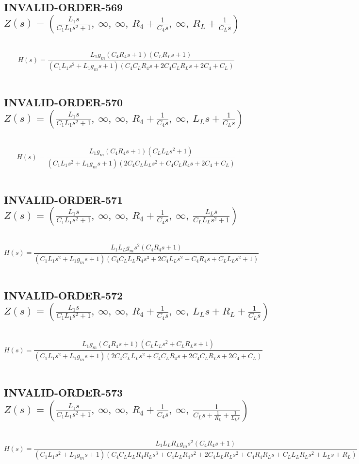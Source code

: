 \documentclass{article}
\begin{document}
\subsection{INVALID-ORDER-569 $Z(s) = \left( \frac{L_{1} s}{C_{1} L_{1} s^{2} + 1}, \  \infty, \  \infty, \  R_{4} + \frac{1}{C_{4} s}, \  \infty, \  R_{L} + \frac{1}{C_{L} s}\right)$ } \ 
\textbf{\[H(s) = \frac{L_{1} g_{m} \left(C_{4} R_{4} s + 1\right) \left(C_{L} R_{L} s + 1\right)}{\left(C_{1} L_{1} s^{2} + L_{1} g_{m} s + 1\right) \left(C_{4} C_{L} R_{4} s + 2 C_{4} C_{L} R_{L} s + 2 C_{4} + C_{L}\right)}\] } \ 
\subsection{INVALID-ORDER-570 $Z(s) = \left( \frac{L_{1} s}{C_{1} L_{1} s^{2} + 1}, \  \infty, \  \infty, \  R_{4} + \frac{1}{C_{4} s}, \  \infty, \  L_{L} s + \frac{1}{C_{L} s}\right)$ } \ 
\textbf{\[H(s) = \frac{L_{1} g_{m} \left(C_{4} R_{4} s + 1\right) \left(C_{L} L_{L} s^{2} + 1\right)}{\left(C_{1} L_{1} s^{2} + L_{1} g_{m} s + 1\right) \left(2 C_{4} C_{L} L_{L} s^{2} + C_{4} C_{L} R_{4} s + 2 C_{4} + C_{L}\right)}\] } \ 
\subsection{INVALID-ORDER-571 $Z(s) = \left( \frac{L_{1} s}{C_{1} L_{1} s^{2} + 1}, \  \infty, \  \infty, \  R_{4} + \frac{1}{C_{4} s}, \  \infty, \  \frac{L_{L} s}{C_{L} L_{L} s^{2} + 1}\right)$ } \ 
\textbf{\[H(s) = \frac{L_{1} L_{L} g_{m} s^{2} \left(C_{4} R_{4} s + 1\right)}{\left(C_{1} L_{1} s^{2} + L_{1} g_{m} s + 1\right) \left(C_{4} C_{L} L_{L} R_{4} s^{3} + 2 C_{4} L_{L} s^{2} + C_{4} R_{4} s + C_{L} L_{L} s^{2} + 1\right)}\] } \ 
\subsection{INVALID-ORDER-572 $Z(s) = \left( \frac{L_{1} s}{C_{1} L_{1} s^{2} + 1}, \  \infty, \  \infty, \  R_{4} + \frac{1}{C_{4} s}, \  \infty, \  L_{L} s + R_{L} + \frac{1}{C_{L} s}\right)$ } \ 
\textbf{\[H(s) = \frac{L_{1} g_{m} \left(C_{4} R_{4} s + 1\right) \left(C_{L} L_{L} s^{2} + C_{L} R_{L} s + 1\right)}{\left(C_{1} L_{1} s^{2} + L_{1} g_{m} s + 1\right) \left(2 C_{4} C_{L} L_{L} s^{2} + C_{4} C_{L} R_{4} s + 2 C_{4} C_{L} R_{L} s + 2 C_{4} + C_{L}\right)}\] } \ 
\subsection{INVALID-ORDER-573 $Z(s) = \left( \frac{L_{1} s}{C_{1} L_{1} s^{2} + 1}, \  \infty, \  \infty, \  R_{4} + \frac{1}{C_{4} s}, \  \infty, \  \frac{1}{C_{L} s + \frac{1}{R_{L}} + \frac{1}{L_{L} s}}\right)$ } \ 
\textbf{\[H(s) = \frac{L_{1} L_{L} R_{L} g_{m} s^{2} \left(C_{4} R_{4} s + 1\right)}{\left(C_{1} L_{1} s^{2} + L_{1} g_{m} s + 1\right) \left(C_{4} C_{L} L_{L} R_{4} R_{L} s^{3} + C_{4} L_{L} R_{4} s^{2} + 2 C_{4} L_{L} R_{L} s^{2} + C_{4} R_{4} R_{L} s + C_{L} L_{L} R_{L} s^{2} + L_{L} s + R_{L}\right)}\] } \ 
\end{document}
